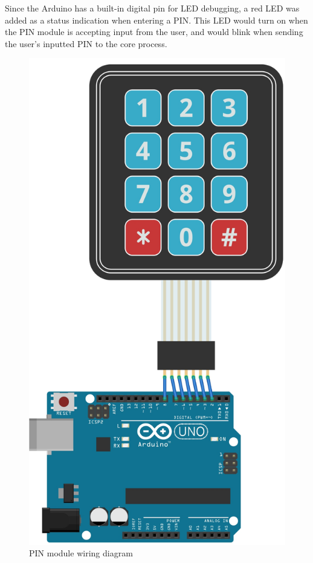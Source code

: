 \documentclass[12pt]{report}
\begin{document}
Since the Arduino has a built-in digital pin for LED debugging, a red LED was added as a status indication when 
entering a PIN. This LED would turn on when the PIN module is accepting input from the user, and would blink when 
sending the user's inputted PIN to the core process.

\begin{figure}
    \centering
    \includegraphics{Diagrams/Hardware-Diagrams/pin_module}
    \caption{PIN module wiring diagram}
    \label{fig:pin-module-wiring}
\end{figure}
\end{document}

